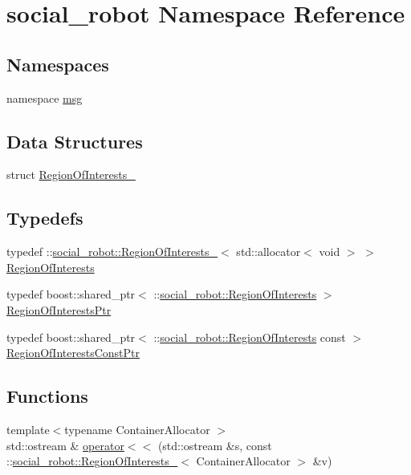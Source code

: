 \hypertarget{namespacesocial__robot}{
\section{social\_\-robot Namespace Reference}
\label{namespacesocial__robot}
}
\subsection*{Namespaces}
\begin{DoxyCompactItemize}
\item 
namespace \hyperlink{namespacesocial__robot_1_1msg}{msg}
\end{DoxyCompactItemize}
\subsection*{Data Structures}
\begin{DoxyCompactItemize}
\item 
struct \hyperlink{structsocial__robot_1_1RegionOfInterests__}{RegionOfInterests\_\-}
\end{DoxyCompactItemize}
\subsection*{Typedefs}
\begin{DoxyCompactItemize}
\item 
typedef ::\hyperlink{structsocial__robot_1_1RegionOfInterests__}{social\_\-robot::RegionOfInterests\_\-}$<$ std::allocator$<$ void $>$ $>$ \hyperlink{namespacesocial__robot_aa3dc27f4d1ca77fde69181e4b8f03a12}{RegionOfInterests}
\item 
typedef boost::shared\_\-ptr$<$ ::\hyperlink{structsocial__robot_1_1RegionOfInterests__}{social\_\-robot::RegionOfInterests} $>$ \hyperlink{namespacesocial__robot_aa7f6c38c555e8e4e3122a84f92ee1877}{RegionOfInterestsPtr}
\item 
typedef boost::shared\_\-ptr$<$ ::\hyperlink{structsocial__robot_1_1RegionOfInterests__}{social\_\-robot::RegionOfInterests} const  $>$ \hyperlink{namespacesocial__robot_ac7a635f483fd71d5452d0203a21cacde}{RegionOfInterestsConstPtr}
\end{DoxyCompactItemize}
\subsection*{Functions}
\begin{DoxyCompactItemize}
\item 
{\footnotesize template$<$typename ContainerAllocator $>$ }\\std::ostream \& \hyperlink{namespacesocial__robot_a10b77f02b388005a3caf2c530acdbac0}{operator$<$$<$} (std::ostream \&s, const ::\hyperlink{structsocial__robot_1_1RegionOfInterests__}{social\_\-robot::RegionOfInterests\_\-}$<$ ContainerAllocator $>$ \&v)
\end{DoxyCompactItemize}


